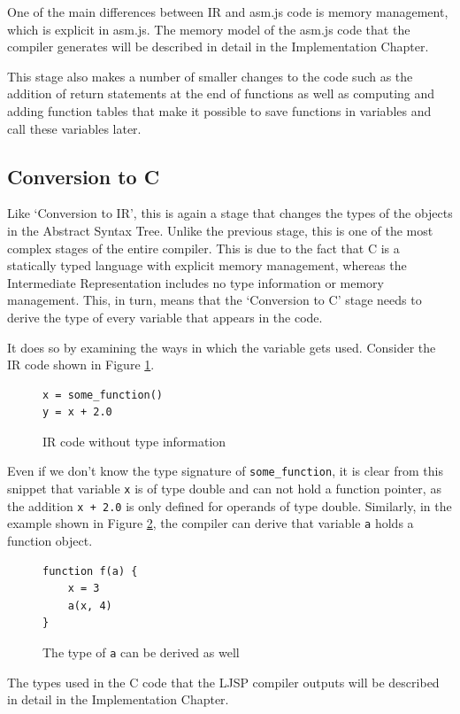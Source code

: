 \documentclass[11pt]{report}
\begin{document}
One of the main differences between IR and asm.js code is memory management, which is explicit in asm.js. The memory model of the asm.js code that the compiler generates will be described in detail in the Implementation Chapter.

This stage also makes a number of smaller changes to the code such as the addition of return statements at the end of functions as well as computing and adding function tables that make it possible to save functions in variables and call these variables later.

\subsection{Conversion to C}
Like `Conversion to IR', this is again a stage that changes the types of the objects in the Abstract Syntax Tree. Unlike the previous stage, this is one of the most complex stages of the entire compiler. This is due to the fact that C is a statically typed language with explicit memory management, whereas the Intermediate Representation includes no type information or memory management. This, in turn, means that the `Conversion to C' stage needs to derive the type of every variable that appears in the code.

It does so by examining the ways in which the variable gets used. Consider the IR code shown in Figure \ref{convc1}.
\begin{figure}[ht]
\begin{lstlisting}
x = some_function()
y = x + 2.0
\end{lstlisting}
\caption{IR code without type information}
\label{convc1}
\end{figure}

Even if we don't know the type signature of \texttt{some_function}, it is clear from this snippet that variable \texttt{x} is of type double and can not hold a function pointer, as the addition \texttt{x + 2.0} is only defined for operands of type double. Similarly, in the example shown in Figure \ref{convc2}, the compiler can derive that variable \texttt{a} holds a function object.
\begin{figure}[ht]
\begin{lstlisting}
function f(a) {
    x = 3
    a(x, 4)
}
\end{lstlisting}
\caption{The type of \texttt{a} can be derived as well}
\label{convc2}
\end{figure}

The types used in the C code that the LJSP compiler outputs will be described in detail in the Implementation Chapter.
\end{document}
